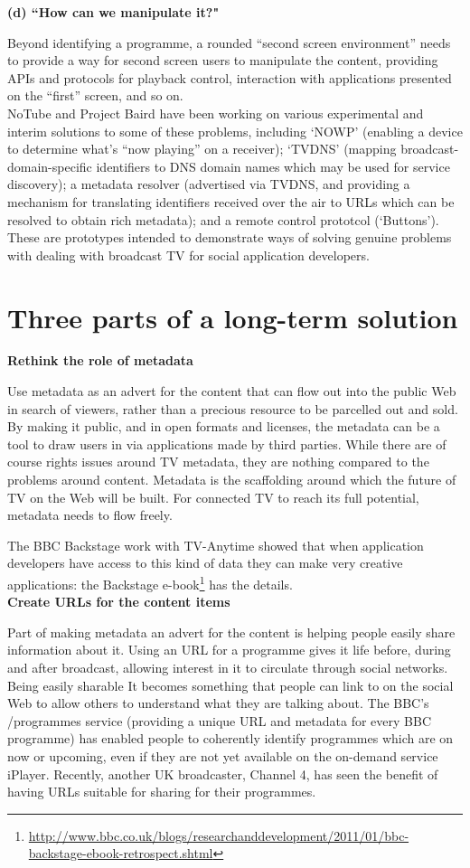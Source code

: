 \documentclass[]{article}%
\begin{document}
{\bf{(d) ``How can we manipulate it?"}}

Beyond identifying a programme, a rounded ``second screen environment'' needs to provide a way for second screen users to manipulate the content, providing APIs and protocols for playback control, interaction with applications presented on the ``first'' screen, and so on.
\\

NoTube and Project Baird have been working on various experimental and interim solutions to some of these problems, including  `NOWP' (enabling a device to determine what's ``now playing'' on a receiver);  `TVDNS' (mapping broadcast-domain-specific identifiers to DNS domain names which may be used for service discovery); a metadata resolver (advertised via TVDNS, and providing a mechanism for translating identifiers received over the air to URLs which can be resolved to obtain rich metadata); and a remote control prototcol (`Buttons'). These are prototypes intended to demonstrate ways of solving genuine problems with dealing with broadcast TV for social application developers. 

\section{Three parts of a long-term solution}

{\bf{Rethink the role of metadata}}

Use metadata as an advert for the content that can flow out into the public Web in search of viewers, rather than a precious resource to be parcelled out and sold. By making it public, and in open formats and licenses, the metadata can be a tool to draw users in via applications made by third parties. While there are of course rights issues around TV metadata, they are nothing compared to the problems around content. Metadata is the scaffolding around which the future of TV on the Web will be built. For connected TV to reach its full potential, metadata needs to flow freely.

The BBC Backstage work with TV-Anytime showed that when application developers have access to this kind of data they can make very creative applications: the Backstage e-book\footnote{\url{http://www.bbc.co.uk/blogs/researchanddevelopment/2011/01/bbc-backstage-ebook-retrospect.shtml}} has the details. 
\\

{\bf{Create URLs for the content items}}

Part of making metadata an advert for the content is helping people easily share information about it. Using an URL for a programme gives it life before, during and after broadcast, allowing interest in it to circulate through social networks. Being easily sharable It becomes something that people can link to on the social Web to allow others to understand what they are talking about.  The BBC's /programmes service (providing a unique URL and metadata for every BBC programme) has enabled people to coherently identify programmes which are on now or upcoming, even if they are not yet available on the on-demand service iPlayer. Recently, another UK broadcaster, Channel 4, has seen the benefit of having URLs suitable for sharing for their programmes.
\end{document}
